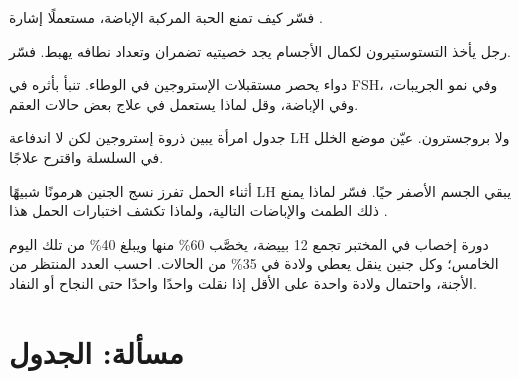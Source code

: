 \begin{exercise}[$\star\star$]\label{exo:g11:hormones-and-reproduction:10}
فسّر كيف تمنع الحبة المركبة الإباضة، مستعملًا إشارة .
\end{exercise}

\begin{exercise}[$\star\star$]\label{exo:g11:hormones-and-reproduction:11}
رجل يأخذ التستوستيرون لكمال الأجسام يجد خصيتيه تضمران وتعداد نطافه
يهبط. فسّر.
\end{exercise}

\begin{exercise}[$\star\star\star$]\label{exo:g11:hormones-and-reproduction:12}
دواء يحصر مستقبلات الإستروجين في الوطاء. تنبأ بأثره في FSH، وفي نمو
الجريبات، وفي الإباضة، وقل لماذا يستعمل في علاج بعض حالات العقم.
\end{exercise}

\begin{exercise}[$\star\star\star$]\label{exo:g11:hormones-and-reproduction:13}
جدول امرأة يبين ذروة إستروجين لكن لا اندفاعة LH ولا بروجسترون. عيّن
موضع الخلل في السلسلة واقترح علاجًا.
\end{exercise}

\begin{exercise}[$\star\star\star$]\label{exo:g11:hormones-and-reproduction:14}
أثناء الحمل تفرز نسج الجنين هرمونًا شبيهًا  LH يبقي الجسم الأصفر حيًا.
فسّر لماذا يمنع ذلك الطمث والإباضات التالية، ولماذا تكشف اختبارات
الحمل هذا .
\end{exercise}

\begin{exercise}[$\star\star\star$]\label{exo:g11:hormones-and-reproduction:15}
دورة إخصاب في المختبر تجمع 12 بييضة، يخصَّب 60\% منها ويبلغ 40\% من
تلك اليوم الخامس؛ وكل جنين ينقل يعطي ولادة في 35\% من الحالات. احسب
العدد المنتظر من الأجنة، واحتمال ولادة واحدة على الأقل إذا نقلت واحدًا
واحدًا حتى النجاح أو النفاد.
\end{exercise}

\section{مسألة: الجدول}

